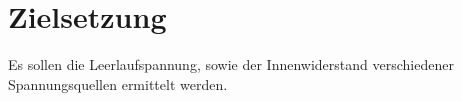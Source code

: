 \section{Zielsetzung}
\label{sec:Zielsetzung}
Es sollen die Leerlaufspannung, sowie der Innenwiderstand verschiedener
Spannungsquellen ermittelt werden.
